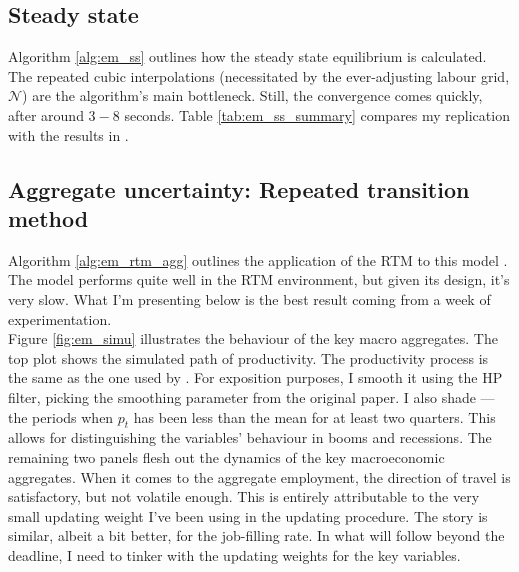 \documentclass[12pt, leqno]{article}
\begin{document}
\subsection{Steady state}

Algorithm \ref{alg:em_ss} outlines how the steady state equilibrium is calculated. 
The repeated cubic interpolations (necessitated by the ever-adjusting labour grid, $\mathcal{N}$) are the algorithm's main bottleneck.
Still, the convergence comes quickly, after around $3-8$ seconds. 
Table \ref{tab:em_ss_summary} compares my replication with the results in \citet{elsby_marginal_2013}.


\begin{table}[H] \centering
    \caption{Steady state equilibrium}
    \label{tab:em_ss_summary}
    
\end{table}
\subsection{Aggregate uncertainty: Repeated transition method}

Algorithm \ref{alg:em_rtm_agg} outlines the application of the RTM to this model \citep{lee_global_2025}.
The model performs quite well in the RTM environment, but given its design, it's very slow.
What I'm presenting below is the best result coming from a week of experimentation. \\

Figure \ref{fig:em_simu} illustrates the behaviour of the key macro aggregates. 
The top plot shows the simulated path of productivity.
The productivity process is the same as the one used by \citet{elsby_marginal_2013}.
For exposition purposes, I smooth it using the HP filter, picking the smoothing parameter from the original paper.
I also shade  --- the periods when $p_t$ has been less than the mean for at least two quarters.
This allows for distinguishing the variables' behaviour in booms and recessions. 
The remaining two panels flesh out the dynamics of the key macroeconomic aggregates.
When it comes to the aggregate employment, the direction of travel is satisfactory, but not volatile enough.
This is entirely attributable to the very small updating weight I've been using in the updating procedure.
The story is similar, albeit a bit better, for the job-filling rate.
In what will follow beyond the deadline, I need to tinker with the updating weights for the key variables.
\end{document}
